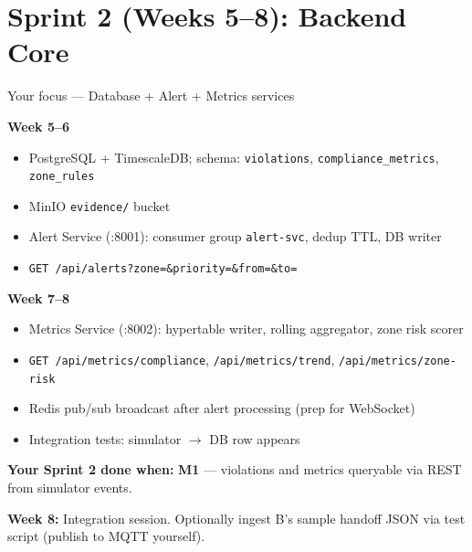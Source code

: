 \documentclass[12pt,a4paper]{article}
\begin{document}
\section{Sprint 2 (Weeks 5--8): Backend Core}

\begin{sprintbox}{Your focus --- Database + Alert + Metrics services}

\begin{taskbox}
\textbf{Week 5--6}
\begin{itemize}
    \item PostgreSQL + TimescaleDB; schema: \texttt{violations}, \texttt{compliance\_metrics}, \texttt{zone\_rules}
    \item MinIO \texttt{evidence/} bucket
    \item Alert Service (:8001): consumer group \texttt{alert-svc}, dedup TTL, DB writer
    \item \texttt{GET /api/alerts?zone=\&priority=\&from=\&to=}
\end{itemize}
\end{taskbox}

\begin{taskbox}
\textbf{Week 7--8}
\begin{itemize}
    \item Metrics Service (:8002): hypertable writer, rolling aggregator, zone risk scorer
    \item \texttt{GET /api/metrics/compliance}, \texttt{/api/metrics/trend}, \texttt{/api/metrics/zone-risk}
    \item Redis pub/sub broadcast after alert processing (prep for WebSocket)
    \item Integration tests: simulator $\rightarrow$ DB row appears
\end{itemize}
\end{taskbox}

\begin{deliverablebox}
\textbf{Your Sprint 2 done when:} \textbf{M1} --- violations and metrics queryable via REST from simulator events.
\end{deliverablebox}

\begin{collabbox}
\textbf{Week 8:} Integration session. Optionally ingest B's sample handoff JSON via test script (publish to MQTT yourself).
\end{collabbox}

\end{sprintbox}
\end{document}
